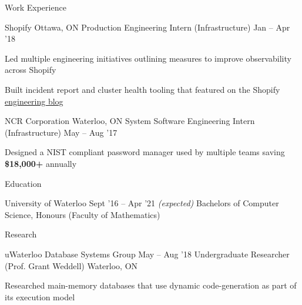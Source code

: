 \documentclass{resume} %
\begin{document}
\begin{rSection}{Work Experience}
  \begin{rWorkSection}{Shopify}
		     {Ottawa, ON}
		     {Production Engineering Intern (Infrastructure)}
		     {Jan -- Apr '18}
    {
      \item Led multiple engineering initiatives outlining measures to improve
        observability across Shopify
      \item Built incident report and cluster health tooling that featured on the Shopify 
        \href{https://engineering.shopify.com/blogs/engineering/implementing-chatops-into-our-incident-management-procedure}
        {\underline{engineering blog}}
    }
  \end{rWorkSection}

  \begin{rWorkSection}{NCR Corporation}
		     {Waterloo, ON}
		     {System Software Engineering Intern (Infrastructure)}
		     {May -- Aug '17}
    {
      \item Designed a NIST compliant password manager used by multiple teams
        saving \textbf{\$18,000+}
        annually
    }
  \end{rWorkSection}
\end{rSection} 


\begin{rSection}{Education}
  \begin{rEducationSection}{University of Waterloo}
		     {Sept '16 -- Apr '21 \em (expected)}
		     {Bachelors of Computer Science, Honours (Faculty of Mathematics)}
  \end{rEducationSection}
\end{rSection} 


\begin{rSection}{Research}
  \begin{rSubsection}{uWaterloo Database Systems Group}
	  {May -- Aug '18}
    {Undergraduate Researcher (Prof. Grant Weddell)}
	  {Waterloo, ON}
    \item Researched main-memory databases that use dynamic
      code-generation as part of its execution model
  \end{rSubsection}
\end{rSection}
\end{document}
